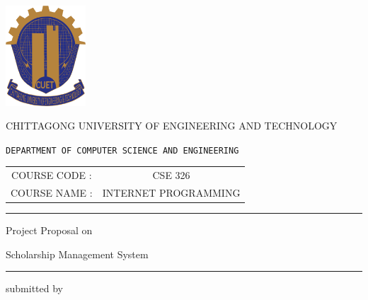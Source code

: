 \documentclass[a4paper,11pt]{report}
\begin{document}
\begin{titlepage}
	\scshape
	\centering

	\includegraphics[width=3cm, keepaspectratio]{cuet.png} \par \vspace{0.1cm}
	\begin{Large}
		CHITTAGONG UNIVERSITY OF ENGINEERING AND TECHNOLOGY
	\end{Large}
	\par
	\texttt{DEPARTMENT OF COMPUTER SCIENCE AND ENGINEERING}
	\vspace{2cm}

	\begin{tabular}{cc}
		COURSE CODE : & CSE 326              \\
		COURSE NAME : & INTERNET PROGRAMMING
	\end{tabular}
	\vspace{1cm}

	\raisebox{-\baselineskip}{\rule{\textwidth}{1px}}
	\rule{\textwidth}{1px}

	\vspace{0.2cm}
	{\Large{{Project Proposal on}}}\par \vspace{0.5cm}
	\huge{{Scholarship Management System }}
	\rule{\textwidth}{2px}


	\vspace{2cm}
	\normalsize

	\parbox[l]{8cm}{
		\begin{center}
			submitted by
		\end{center}

}
\end{titlepage}
\end{document}
